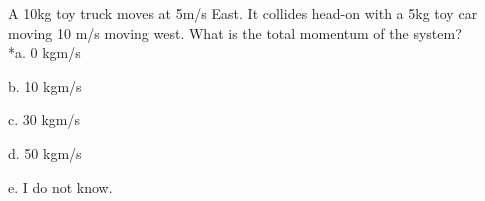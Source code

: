 
A 10kg toy truck moves at 5m/s East. It collides head-on with a 5kg toy car moving 10 m/s moving west. What is the total momentum of the system?\\

*a. 0 kgm/s

b. 10 kgm/s

c. 30 kgm/s

d. 50 kgm/s

e. I do not know. \\
